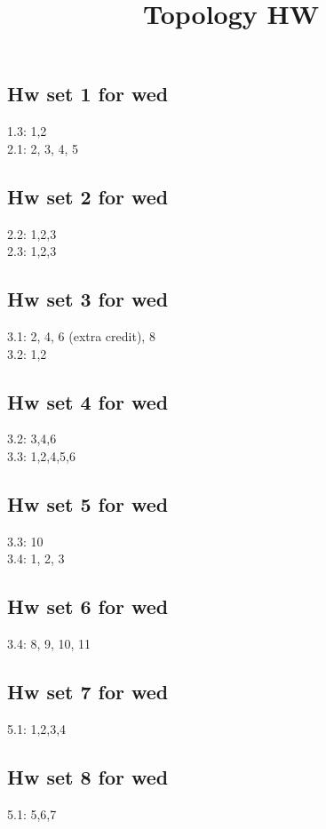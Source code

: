\documentclass{amsart}
\numberwithin{equation}{section}
\theoremstyle{definition}
\theoremstyle{remark}
\begin{document}
\title{Topology HW}
\maketitle
\subsection*{Hw set 1 for wed}
1.3: 1,2 \\ 
2.1: 2, 3, 4, 5  
\subsection*{Hw set 2 for wed}
2.2: 1,2,3 \\
2.3: 1,2,3
\subsection*{Hw set 3 for wed}
3.1: 2, 4, 6 (extra credit), 8 \\
3.2: 1,2
\subsection*{Hw set 4 for wed}
3.2: 3,4,6 \\
3.3: 1,2,4,5,6   
\subsection*{Hw set 5 for wed}
3.3: 10 \\
3.4: 1, 2, 3 
\subsection*{Hw set 6 for wed}
3.4: 8, 9, 10, 11
\subsection*{Hw set 7 for wed}
5.1: 1,2,3,4 \\
\subsection*{Hw set 8 for wed}
5.1: 5,6,7 \\
\end{document}
